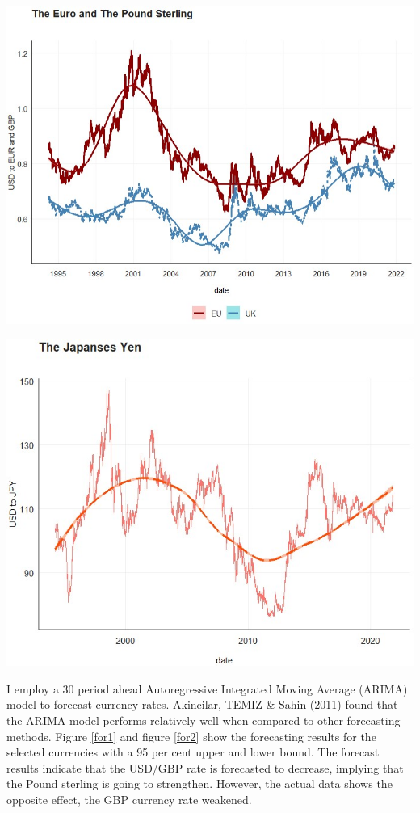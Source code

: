\documentclass[11pt,preprint, authoryear]{elsarticle}
\let\origfigure\figure
\let\endorigfigure\endfigure
\renewenvironment{figure}[1][2] {
    \expandafter\origfigure\expandafter[H]
} {
    \endorigfigure
}
\numberwithin{equation}{section}
\numberwithin{figure}{section}
\numberwithin{table}{section}
\begin{document}
\begin{figure}
\centering 
\begin{minipage}[t]{8.2cm} 
\centering 
 \includegraphics[width=\linewidth]{for1.jpg} 
 \end{minipage} 
 \hspace{0.1cm} 
 \begin{minipage}[t]{8.2cm} 
 \centering 
 \includegraphics[width=\linewidth]{for2.jpg} 
 \end{minipage}
\caption{The three most traded currencies}
\label{for}
\end{figure}

I employ a 30 period ahead Autoregressive Integrated Moving Average
(ARIMA) model to forecast currency rates.
\protect\hyperlink{ref-akin}{Akincilar, TEMIZ \& Sahin}
(\protect\hyperlink{ref-akin}{2011}) found that the ARIMA model performs
relatively well when compared to other forecasting methods. Figure
\ref{for1} and figure \ref{for2} show the forecasting results for the
selected currencies with a 95 per cent upper and lower bound. The
forecast results indicate that the USD/GBP rate is forecasted to
decrease, implying that the Pound sterling is going to strengthen.
However, the actual data shows the opposite effect, the GBP currency
rate weakened.
\end{document}
